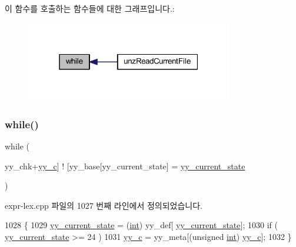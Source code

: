 이 함수를 호출하는 함수들에 대한 그래프입니다.\+:
\nopagebreak
\begin{figure}[H]
\begin{center}
\leavevmode
\includegraphics[width=256pt]{expr-lex_8cpp_a8fdafe3be7e00ce3d4f0cb50a9a5eb39_icgraph}
\end{center}
\end{figure}
\mbox{\label{expr-lex_8cpp_a0e48c1f64b558d03d870367324920354}} 
\subsubsection{\texorpdfstring{while()}{while()}\hspace{0.1cm}{\footnotesize\ttfamily [2/2]}}
{\footnotesize\ttfamily while (\begin{DoxyParamCaption}\item[{yy\+\_\+chk+\mbox{\hyperlink{expr-lex_8cpp_a2ce7598a28e3deb63b5ef934b031a93f}{yy\+\_\+c}}\mbox{]} !}]{\mbox{[}yy\+\_\+base\mbox{[}yy\+\_\+current\+\_\+state\mbox{]} = {\ttfamily \mbox{\hyperlink{expr-lex_8cpp_abb8b9672f94e21056888ae611b41cd1b}{yy\+\_\+current\+\_\+state}}} }\end{DoxyParamCaption})}



expr-\/lex.\+cpp 파일의 1027 번째 라인에서 정의되었습니다.


\begin{DoxyCode}
1028                 \{
1029                 \mbox{\hyperlink{expr-lex_8cpp_abb8b9672f94e21056888ae611b41cd1b}{yy\_current\_state}} = (\mbox{\hyperlink{_util_8cpp_a0ef32aa8672df19503a49fab2d0c8071}{int}}) yy\_def[
      \mbox{\hyperlink{expr-lex_8cpp_abb8b9672f94e21056888ae611b41cd1b}{yy\_current\_state}}];
1030                 \textcolor{keywordflow}{if} ( \mbox{\hyperlink{expr-lex_8cpp_abb8b9672f94e21056888ae611b41cd1b}{yy\_current\_state}} >= 24 )
1031                         \mbox{\hyperlink{expr-lex_8cpp_a2ce7598a28e3deb63b5ef934b031a93f}{yy\_c}} = yy\_meta[(\textcolor{keywordtype}{unsigned} \mbox{\hyperlink{_util_8cpp_a0ef32aa8672df19503a49fab2d0c8071}{int}}) \mbox{\hyperlink{expr-lex_8cpp_a2ce7598a28e3deb63b5ef934b031a93f}{yy\_c}}];
1032                 \}
\end{DoxyCode}
\mbox{\label{expr-lex_8cpp_a05a39a25571bbcfcf45a1e04a8c24f9b}} 
